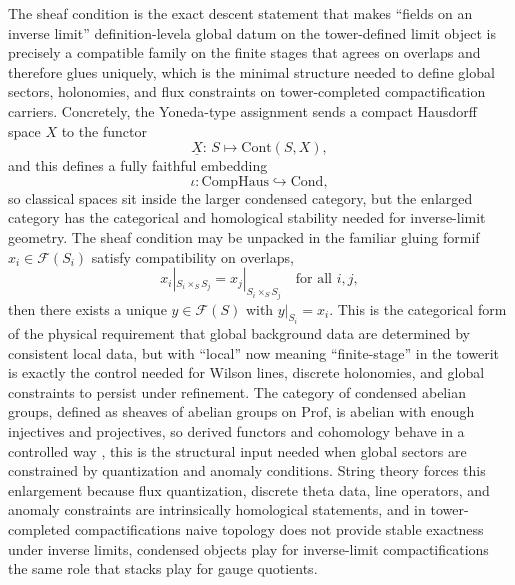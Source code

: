 \documentclass[11pt]{article}
\theoremstyle{remark}
\newcommand{\calF}{\mathcal{F}}
\begin{document}
 The sheaf condition is the exact descent statement that makes ``fields on an inverse limit'' definition-level\:a global datum on the tower-defined limit object is precisely a compatible family on the finite stages that agrees on overlaps and therefore glues uniquely, which is the minimal structure needed to define global sectors, holonomies, and flux constraints on tower-completed compactification carriers. Concretely, the Yoneda-type assignment sends a compact Hausdorff space \(X\) to the functor
\begin{equation}\label{4}
\underline{X}:\,S\mapsto \mathrm{Cont}(S,X),
\end{equation}
and this defines a fully faithful embedding
\begin{equation}\label{5}
\iota:\mathrm{CompHaus}\hookrightarrow \mathrm{Cond},
\end{equation}
so classical spaces sit inside the larger condensed category, but the enlarged category has the categorical and homological stability needed for inverse-limit geometry. The sheaf condition may be unpacked in the familiar gluing form\:if \(x_i\in \calF(S_i)\) satisfy compatibility on overlaps,
\begin{equation}\label{6}
x_i|_{S_i\times_S S_j}=x_j|_{S_i\times_S S_j}\quad\text{for all }i,j,
\end{equation}
then there exists a unique \(y\in \calF(S)\) with \(y|_{S_i}=x_i\). This is the categorical form of the physical requirement that global background data are determined by consistent local data, but with ``local'' now meaning ``finite-stage'' in the tower\:it is exactly the control needed for Wilson lines, discrete holonomies, and global constraints to persist under refinement. The category of condensed abelian groups, defined as sheaves of abelian groups on \(\mathrm{Prof}\), is abelian with enough injectives and projectives, so derived functors and cohomology behave in a controlled way \cite{ClausenScholze}, this is the structural input needed when global sectors are constrained by quantization and anomaly conditions. String theory forces this enlargement because flux quantization, discrete theta data, line operators, and anomaly constraints are intrinsically homological statements, and in tower-completed compactifications naive topology does not provide stable exactness under inverse limits, condensed objects play for inverse-limit compactifications the same role that stacks play for gauge quotients.
\end{document}
